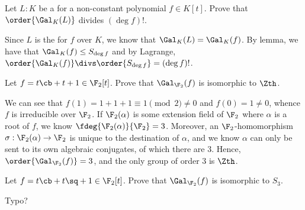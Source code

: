 \documentclass{article}
\begin{document}
\begin{exercise}
  Let \( L:K \) be a \sfe for a non-constant polynomial \( f\in K[t] \).
  Prove that \( \order{\Gal_K(L)} \) divides \( (\deg f)! \).
\end{exercise}
\begin{solution}
  Since \( L \) is the \sfe for \( f \) over \( K \), we know that \( \Gal_K(L) = \Gal_K(f) \).
  By lemma, we have that \( \Gal_K(f)\leq S_{\deg f} \) and by Lagrange, \( \order{\Gal_K(f)} \divs \order{S_{\deg f}}=(\deg f)! \).
\end{solution}

\begin{subexercise}
Let \( f = t\cb+t+1\in \F_2[t] \). Prove that \( \Gal_{\F_2}(f) \) is isomorphic to \( \Zth \).
\end{subexercise}
\begin{solution}
We can see that \( f(1) = 1 + 1 + 1 \equiv 1 \pmod 2 \neq 0 \) and \( f(0) = 1 \neq 0 \), whence \( f \) is irreducible over \( \F_2 \).
If \( \F_2(\alpha) \) is some extension field of \( \F_2 \) where \( \alpha \) is a root of \( f \), we know \( \fdeg{\F_2(\alpha)}{\F_2}=3 \).
Moreover, an \( \F_2 \)-homomorphism \( \sigma:\F_2(\alpha)\to \F_2 \) is unique to the destination of \( \alpha \), and we know \( \alpha \) can only be sent to its own algebraic conjugates, of which there are 3.
Hence, \( \order{\Gal_{\F_2}(f)}=3 \), and the only group of order 3 is \( \Zth \).
\end{solution}

\begin{subexercise}
Let \( f = t\cb+t\sq+1\in \F_2[t] \). Prove that \( \Gal_{\F_2}(f) \) is isomorphic to \( S_3 \).
\end{subexercise}
\begin{solution}
Typo?
\end{solution}
\end{document}
